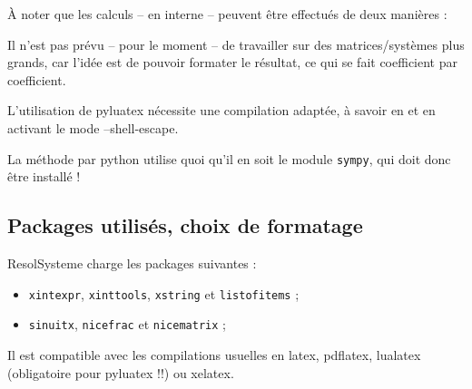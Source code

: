 \documentclass[french,a4paper,11pt]{article}
\begin{document}
\begin{importantblock}
À noter que les calculs -- en interne -- peuvent être effectués de deux manières :


Il n'est pas prévu -- pour le moment -- de travailler sur des matrices/systèmes plus grands, car l'idée est de pouvoir formater le résultat, ce qui se fait coefficient par coefficient.
\end{importantblock}

\begin{warningblock}
L'utilisation de \textsf{pyluatex} nécessite une compilation adaptée, à savoir en  et en activant le mode \textsf{--shell-escape}. 

\smallskip

La méthode par \textsf{python} utilise quoi qu'il en soit le module \texttt{sympy}, qui doit donc être installé !
\end{warningblock}

\subsection{Packages utilisés, choix de formatage}

\begin{noteblock}
\textsf{ResolSysteme} charge les packages suivantes :

\begin{itemize}
	\item \texttt{xintexpr}, \texttt{xinttools}, \texttt{xstring} et \texttt{listofitems} ;
	\item \texttt{sinuitx}, \texttt{nicefrac} et \texttt{nicematrix} ;
\end{itemize}

Il est compatible avec les compilations usuelles en \textsf{latex}, \textsf{pdflatex}, \textsf{lualatex} (obligatoire pour \textsf{pyluatex} !!) ou \textsf{xelatex}.
\end{noteblock}
\end{document}
